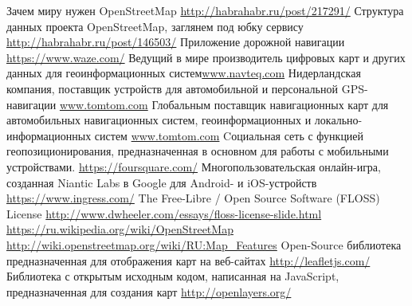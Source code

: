 \renewcommand{\bibname}{Ссылки и примечания}
\begin{thebibliography}{10}
     Зачем миру нужен OpenStreetMap 
        \url{http://habrahabr.ru/post/217291/}
     Структура данных проекта OpenStreetMap, заглянем под 
        юбку сервису \url{http://habrahabr.ru/post/146503/}
     Приложение дорожной навигации \url{https://www.waze.com/}
     Ведущий в мире производитель цифровых карт и других 
        данных для геоинформационных систем\url{www.navteq.com}
     Нидерландская компания, поставщик устройств для 
        автомобильной и персональной GPS-навигации \url{www.tomtom.com}
     Глобальным поставщик навигационных карт для 
        автомобильных навигационных систем, геоинформационных и 
        локально-информационных систем \url{www.tomtom.com}
     Cоциальная сеть с функцией геопозиционирования, 
        предназначенная в основном для работы с мобильными устройствами.
        \url{https://foursquare.com/}
     Многопользовательская онлайн-игра, созданная 
        Niantic Labs в Google для Android- и iOS-устройств 
        \url{https://www.ingress.com/}
     The Free-Libre / Open Source Software (FLOSS) License 
        \url{http://www.dwheeler.com/essays/floss-license-slide.html}
     \url{https://ru.wikipedia.org/wiki/OpenStreetMap}
     \url{http://wiki.openstreetmap.org/wiki/RU:Map_Features}
     Open-Source библиотека предназначенная для отображения 
        карт на веб-сайтах \url{http://leafletjs.com/}
     Библиотека с открытым исходным кодом, написанная на 
        JavaScript, предназначенная для создания карт 
        \url{http://openlayers.org/}
\end{thebibliography}